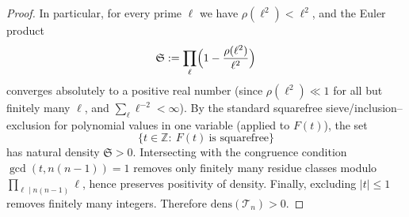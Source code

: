 \documentclass[10pt,a4paper]{amsart}
\newcommand{\Z}{\mathbb{Z}}
\begin{document}
\begin{proof}
In particular, for every prime $\ell$ we have $\rho(\ell^2)<\ell^2$, and the Euler product
\[
\mathfrak S:=\prod_{\ell}\Bigl(1-\frac{\rho(\ell^2)}{\ell^2}\Bigr)
\]
converges absolutely to a positive real number (since $\rho(\ell^2)\ll 1$ for all but finitely many $\ell$,
and $\sum_\ell \ell^{-2}<\infty$). By the standard squarefree sieve/inclusion--exclusion for polynomial values
in one variable (applied to $F(t)$), the set
\[
\{t\in\Z:\ F(t)\ \text{is squarefree}\}
\]
has natural density $\mathfrak S>0$. Intersecting with the congruence condition $\gcd(t,n(n-1))=1$
removes only finitely many residue classes modulo $\prod_{\ell\mid n(n-1)}\ell$, hence preserves positivity
of density. Finally, excluding $|t|\le 1$ removes finitely many integers. Therefore $\mathrm{dens}(\mathcal T_n)>0$.

\end{proof}
\end{document}
